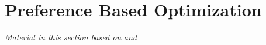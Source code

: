 \chapter{Preference Based Optimization}\label{sec:preference_optimization}

\graphicspath{{chapters/preference_optimization/figures/}}

\emph{Material in this section based on}
\citet{thatte2017sample}\cite{thatte2017sample} \emph{and}
\citet{thatte2018method}\cite{thatte2018method} 
\linebreak










